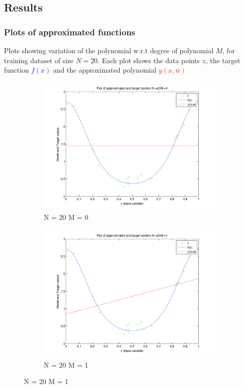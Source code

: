 \documentclass{article}
\begin{document}
\subsection{Results}

\subsubsection{Plots of approximated functions}

Plots showing variation of the polynomial w.r.t degree of polynomial $M$, for training dataset of size $N = 20$. Each plot shows the data points \textcolor{green}{x}, the target function \textcolor{blue}{$f(x)$}  and the approximated polynomial \textcolor{red}{$y(x,\bar{w})$} 
\begin{figure}[hbtp]

\begin{subfigure}{.5\textwidth}
\centering
\includegraphics[width=\linewidth]{../Code/Plots_1/Varying_M/VaryingM_N20M0.png}
\caption{N = 20 M = 0}
\end{subfigure}
\begin{subfigure}{.5\textwidth}
\includegraphics[width=\linewidth]{../Code/Plots_1/Varying_M/VaryingM_N20M1.png}
\caption{N = 20 M = 1}
\end{subfigure}



\end{figure}
\end{document}
